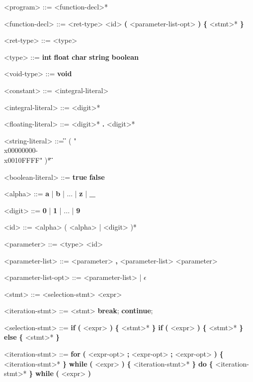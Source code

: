 \documentclass{article}
\begin{document}
		\begin{grammar}
			<program> ::= <function-decl>*

			<function-decl> ::= <ret-type> <id> \textbf{(} <parameter-list-opt> \textbf{)} \textbf{\{} <stmt>* \textbf{\}}

			<ret-type> ::= <type>
			\alt <void-type>
			
			<type> ::= \textbf{int}
			\alt \textbf{float}
			\alt \textbf{char}
			\alt \textbf{string}
			\alt \textbf{boolean}

			<void-type> ::= \textbf{void}

			<constant> ::= <integral-literal>
			\alt <floating-literal>
			\alt <string-literal>
			\alt <boolean-literal>

			<integral-literal> ::= <digit>*
			
			<floating-literal> ::= <digit>* \textbf{.} <digit>*
			
			<string-literal> ::= \textbf{\"} ( "\\x00000000-\\x0010FFFF" )*  \textbf{\"}
			
			<boolean-literal> ::= \textbf{true}
			\alt \textbf{false}
			
			<alpha> ::= \textbf{a} | \textbf{b} | ... | \textbf{z} | \textbf{_}

			<digit> ::= \textbf{0} | \textbf{1} | ... | \textbf{9}

	
			<id> ::= <alpha> ( <alpha> | <digit> )*
			
			<parameter> ::= <type> <id>
			
			<parameter-list> ::= <parameter> \textbf{,} <parameter-list>
			\alt <parameter>
			
			<parameter-list-opt> ::= <parameter-list> | $\epsilon$
			
			<stmt> ::= <selection-stmt>
			\alt <iteration-stmt>
			\alt <jump-stmt>
			\alt <var-decl>
			\alt <expr>
			\alt <unary-expr>
			
			<iteration-stmt> ::= <stmt>
			\alt \textbf{break};
			\alt \textbf{continue};
			
			<selection-stmt> ::= \textbf{if} \textbf{(} <expr> \textbf{)} \textbf{\{} <stmt>* \textbf{\}}
			\alt \textbf{if} \textbf{(} <expr> \textbf{)} \textbf{\{} <stmt>* \textbf{\}} \textbf{else} \textbf{\{} <stmt>* \textbf{\}}
			
			<iteration-stmt> ::= \textbf{for} \textbf{(} <expr-opt> \textbf{;} <expr-opt> \textbf{;} <expr-opt> \textbf{)} \textbf{\{} <iteration-stmt>* \textbf{\}}
			\alt \textbf{while} \textbf{(} <expr> \textbf{)} \textbf{\{} <iteration-stmt>* \textbf{\}}
			\alt \textbf{do} \textbf{\{} <iteration-stmt>* \textbf{\}} \textbf{while} \textbf{(} <expr> \textbf{)} 
			

\end{grammar}
\end{document}
